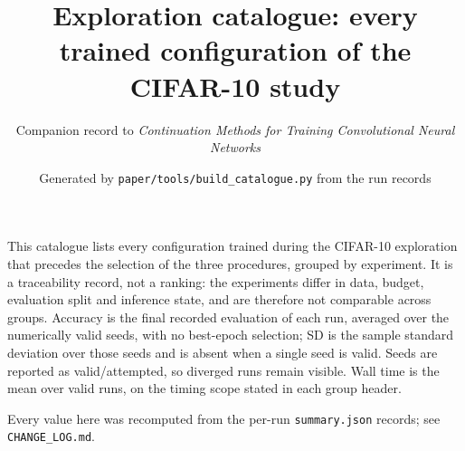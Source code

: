 \documentclass[10pt]{article}
\begin{document}
\title{Exploration catalogue: every trained configuration of the CIFAR-10 study}
\author{Companion record to \emph{Continuation Methods for Training Convolutional Neural
Networks}}
\date{Generated by \texttt{paper/tools/build\_catalogue.py} from the run records}
\maketitle

This catalogue lists every configuration trained during the CIFAR-10 exploration that
precedes the selection of the three procedures, grouped by experiment.  It is a
traceability record, not a ranking: the experiments differ in data, budget, evaluation
split and inference state, and are therefore not comparable across groups.  Accuracy is
the final recorded evaluation of each run, averaged over the numerically valid seeds,
with no best-epoch selection; SD is the sample standard deviation over those seeds and is
absent when a single seed is valid.  Seeds are reported as valid/attempted, so diverged
runs remain visible.  Wall time is the mean over valid runs, on the timing scope stated in
each group header.

Every value here was recomputed from the per-run \texttt{summary.json} records; see
\texttt{CHANGE\_LOG.md}.
\end{document}
